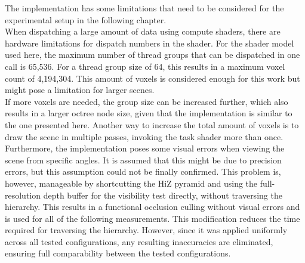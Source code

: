 The implementation has some limitations that need to be considered for the experimental setup 
in the following chapter. \\

\noindent
When dispatching a large amount of data using compute shaders, there are hardware limitations for 
dispatch numbers in the shader. For the shader model used here, the maximum number of thread groups 
that can be dispatched in one call is 65,536. For a thread group size of 64, this results in a 
maximum voxel count of 4,194,304. This amount of voxels is considered enough for this work but 
might pose a limitation for larger scenes. \\

\noindent
If more voxels are needed, the group size can be increased further, which also results in a larger 
octree node size, given that the implementation is similar to the one presented here. Another way 
to increase the total amount of voxels is to draw the scene in multiple passes, invoking the task 
shader more than once. \\

\noindent
Furthermore, the implementation poses some visual errors when viewing the scene from specific 
angles. It is assumed that this might be due to precision errors, but this assumption could not 
be finally confirmed. This problem is, however, manageable by shortcutting the \ac{HiZ} pyramid 
and using the full-resolution depth buffer for the visibility test directly, without traversing 
the hierarchy. This results in a functional occlusion culling without visual errors and is used 
for all of the following measurements. This modification reduces the time required for traversing 
the hierarchy. However, since it was applied uniformly across all tested configurations, any 
resulting inaccuracies are eliminated, ensuring full comparability between the tested configurations. 
